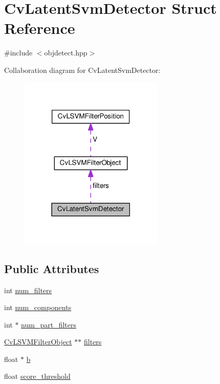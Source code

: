 \hypertarget{structCvLatentSvmDetector}{\section{Cv\-Latent\-Svm\-Detector Struct Reference}
\label{structCvLatentSvmDetector}
}


{\ttfamily \#include $<$objdetect.\-hpp$>$}



Collaboration diagram for Cv\-Latent\-Svm\-Detector\-:\nopagebreak
\begin{figure}[H]
\begin{center}
\leavevmode
\includegraphics[width=194pt]{structCvLatentSvmDetector__coll__graph}
\end{center}
\end{figure}
\subsection*{Public Attributes}
\begin{DoxyCompactItemize}
\item 
int \hyperlink{structCvLatentSvmDetector_a331cfe56315faa82db21f4d6cf8fc70d}{num\-\_\-filters}
\item 
int \hyperlink{structCvLatentSvmDetector_a4611e6040fbf6125b77bf82d3bce34c5}{num\-\_\-components}
\item 
int $\ast$ \hyperlink{structCvLatentSvmDetector_a4d50021754c10d8ffbf2db63d67b996d}{num\-\_\-part\-\_\-filters}
\item 
\hyperlink{structCvLSVMFilterObject}{Cv\-L\-S\-V\-M\-Filter\-Object} $\ast$$\ast$ \hyperlink{structCvLatentSvmDetector_a3810082f5bad11f6330d2d33a7ec8635}{filters}
\item 
float $\ast$ \hyperlink{structCvLatentSvmDetector_a55926902e350d2cdf262a0ffdea6ac64}{b}
\item 
float \hyperlink{structCvLatentSvmDetector_a29e3e3b5a0fa4f040aa465ff3f06b124}{score\-\_\-threshold}
\end{DoxyCompactItemize}


